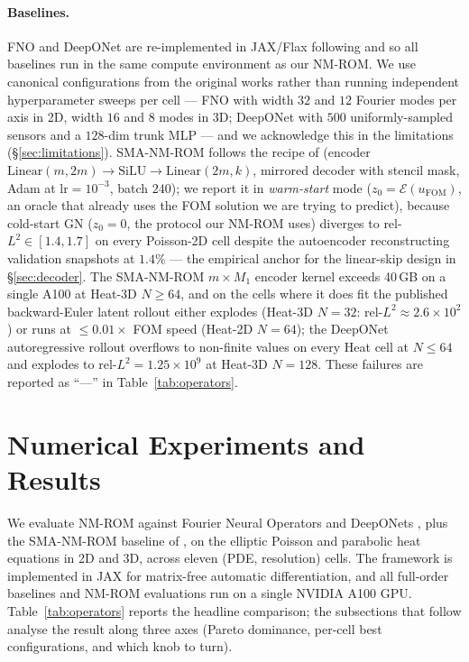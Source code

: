 \documentclass{article}
\begin{document}
\paragraph{Baselines.}
FNO and DeepONet are re-implemented in JAX/Flax following
\citet{Li2020FNO} and \citet{Lu2021DeepONet} so all baselines run in
the same compute environment as our NM-ROM. We use canonical
configurations from the original works rather than running
independent hyperparameter sweeps per cell --- FNO with width $32$
and $12$ Fourier modes per axis in 2D, width $16$ and $8$ modes in
3D; DeepONet with $500$ uniformly-sampled sensors and a $128$-dim
trunk MLP --- and we acknowledge this in the limitations
(\S\ref{sec:limitations}). SMA-NM-ROM follows the
recipe of \citet{KimChoi2022NMROM} (encoder
$\mathrm{Linear}(m,2m){\to}\mathrm{SiLU}{\to}\mathrm{Linear}(2m,k)$,
mirrored decoder with stencil mask, Adam at $\mathrm{lr}=10^{-3}$,
batch $240$); we report it in \emph{warm-start} mode
($z_0=\mathcal{E}(u_\mathrm{FOM})$, an oracle that already uses the
FOM solution we are trying to predict), because cold-start GN
($z_0=0$, the protocol our NM-ROM uses) diverges to rel-$L^2 \in
[1.4,1.7]$ on every Poisson-2D cell despite the autoencoder
reconstructing validation snapshots at $1.4\%$ — the empirical anchor
for the linear-skip design in \S\ref{sec:decoder}. The SMA-NM-ROM
$m{\times}M_1$ encoder kernel exceeds 40\,GB on a single A100 at
Heat-3D $N{\geq}64$, and on the cells where it does fit the
published backward-Euler latent rollout either explodes (Heat-3D
$N{=}32$: rel-$L^2 \approx 2.6\times 10^{2}$) or runs at
$\leq 0.01\times$ FOM speed (Heat-2D $N{=}64$); the DeepONet
autoregressive rollout overflows to non-finite values on every Heat
cell at $N{\leq}64$ and explodes to rel-$L^2{=}1.25\times 10^{9}$ at
Heat-3D $N{=}128$. These failures are reported as ``---'' in
Table~\ref{tab:operators}.



  \section{Numerical Experiments and Results}
  \label{sec:results}                                                                                      
  
  We evaluate NM-ROM against Fourier Neural Operators \citep{Li2020FNO}
  and DeepONets \citep{Lu2021DeepONet}, plus the SMA-NM-ROM baseline
  of \citet{KimChoi2022NMROM}, on the elliptic Poisson and parabolic
  heat equations in 2D and 3D, across eleven (PDE, resolution) cells.
  The framework is implemented in
  JAX \citep{Bradbury2018JAX} for matrix-free automatic differentiation,
  and all full-order baselines and NM-ROM evaluations run on a single
  NVIDIA A100 GPU. Table~\ref{tab:operators} reports the headline
  comparison; the subsections that follow analyse the result along
  three axes (Pareto dominance, per-cell best configurations, and
  which knob to turn).
\end{document}
